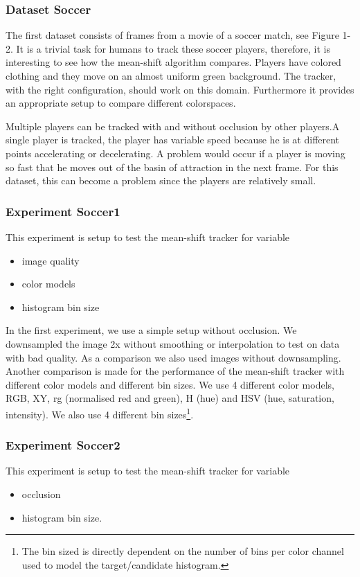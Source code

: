 \documentclass[a4paper,11pt]{article}
\begin{document}
\subsubsection{Dataset Soccer}
The first dataset consists of frames from a movie of a soccer match, see Figure 1-2. It is a trivial task for 
humans to track these soccer players, therefore, it is interesting to see how the mean-shift algorithm compares.  
Players have colored clothing and they move on an almost uniform green background. The tracker, with the right configuration, should work on this domain. Furthermore it provides an appropriate setup to compare different colorspaces.

Multiple players can be tracked with and without occlusion by other players.A single player is tracked, the player has variable speed because he is at
different points accelerating or decelerating. A problem would occur if a
player is moving so fast that he moves out of the basin of attraction in the
next frame. For this dataset, this can become a problem since the players are
relatively small.




\subsubsection{Experiment Soccer1}
This experiment is setup to test the mean-shift tracker for variable
\begin{itemize}
\item image quality
\item color models
\item histogram bin size
 \end{itemize}

In the first experiment, we use a simple setup without occlusion. We downsampled
the image 2x without smoothing or interpolation to test on data with bad
quality. As a comparison we also used images without downsampling. Another comparison is made for the performance of the mean-shift tracker with different color models
and different bin sizes.  We use 4 different color models, RGB, XY, rg
(normalised red and green), H (hue) and HSV (hue, saturation, intensity). We
also use 4 different bin sizes\footnote{The bin sized is directly dependent on  the number of bins
per color channel used to model the target/candidate histogram.}.

\subsubsection{Experiment Soccer2}
This experiment is setup to test the mean-shift tracker for variable
\begin{itemize}
\item occlusion
\item histogram bin size.
\end{itemize}
\end{document}
